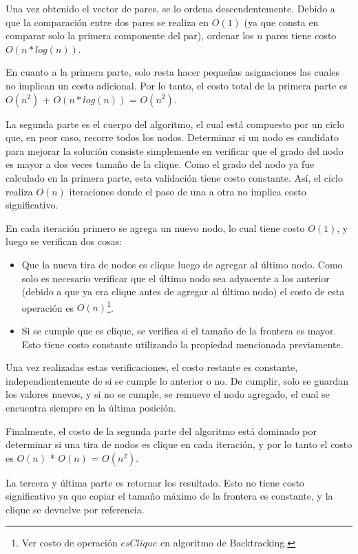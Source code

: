 Una vez obtenido el vector de pares, se lo ordena descendentemente. Debido a que la comparaci\'on entre dos pares se realiza en $O(1)$ (ya que consta en comparar solo la primera componente del par), ordenar los $n$ pares tiene costo $O(n*log(n))$.

En cuanto a la primera parte, solo resta hacer pequeñas asignaciones las cuales no implican un costo adicional. Por lo tanto, el costo total de la primera parte es $O(n^2)$ + $O(n*log(n))$ = $O(n^2)$.

La segunda parte es el cuerpo del algoritmo, el cual está compuesto por un ciclo que, en peor caso, recorre todos los nodos. Determinar si un nodo es candidato para mejorar la solución consiste simplemente en verificar que el grado del nodo es mayor a dos veces tamaño de la clique. Como el grado del nodo ya fue calculado en la primera parte, esta validación tiene costo constante. Así, el ciclo realiza $O(n)$ iteraciones donde el paso de una a otra no implica costo significativo.

En cada iteración primero se agrega un nuevo nodo, lo cual tiene costo $O(1)$, y luego se verifican dos cosas:

\begin{itemize}
\item Que la nueva tira de nodos es clique luego de agregar al último nodo. Como solo es necesario verificar que el último nodo sea adyacente a los anterior (debido a que ya era clique antes de agregar al último nodo) el costo de esta operación es $O(n)$\footnote{ Ver costo de operación $esClique$ en algoritmo de Backtracking.}. 
\item Si se cumple que es clique, se verifica si el tamaño de la frontera es mayor. Esto tiene costo constante utilizando la propiedad mencionada previamente.
\end{itemize}

Una vez realizadas estas verificaciones, el costo restante es constante, independientemente de si se cumple lo anterior o no. De cumplir, solo se guardan los valores nuevos, y si no se cumple, se remueve el nodo agregado, el cual se encuentra siempre en la última posición.

Finalmente, el costo de la segunda parte del algoritmo está dominado por determinar si una tira de nodos es clique en cada iteración, y por lo tanto el costo es $O(n)$ * $O(n)$ = $O(n^2)$.

La tercera y última parte es retornar los resultado. Esto no tiene costo significativo ya que copiar el tamaño máximo de la frontera es constante, y la clique se devuelve por referencia.

